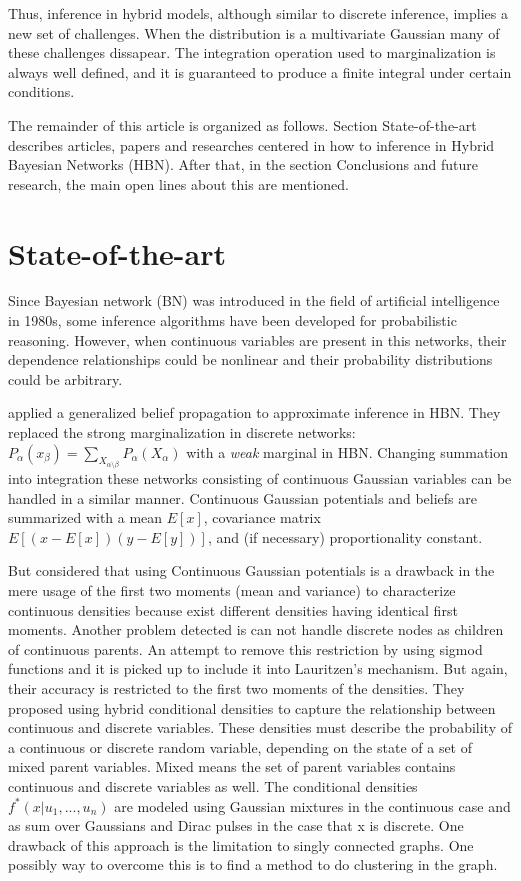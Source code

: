 \documentclass[a4paper,11pt]{article}
\begin{document}
Thus, inference in hybrid models, although similar to discrete inference, implies a new set of challenges. When the distribution is a multivariate Gaussian many of these challenges dissapear. The integration operation used to marginalization is always well defined, and it is guaranteed to produce a finite integral under certain conditions.

The remainder of this article is organized as follows. Section State-of-the-art describes articles, papers and  researches centered in how to inference in Hybrid Bayesian Networks (HBN). After that, in the section Conclusions and future research, the main open lines about this are mentioned.

\section{State-of-the-art}

Since Bayesian network (BN) was introduced in the field of artificial intelligence in 1980s, some inference algorithms have been developed for probabilistic reasoning. However, when continuous variables are present in this networks, their dependence relationships could be nonlinear and their probability distributions could be arbitrary. 

\cite{heskeszoeter2003} applied a generalized belief propagation to approximate inference in HBN. They replaced the strong marginalization in discrete networks: 
$ P_{\alpha}(x_{\beta}) = \sum_{X_{\alpha\setminus\beta}}P_{\alpha}(X_{\alpha}) $ with a \textit{weak} marginal in HBN. Changing summation into integration these networks consisting of continuous Gaussian variables can be handled in a similar manner. Continuous Gaussian potentials and beliefs are summarized with a mean $E[x]$, covariance matrix $ E[(x-E[x])(y-E[y])] $, and (if necessary) proportionality constant.

But \cite{heskeszoeter2004} considered that  using  Continuous Gaussian potentials is a drawback in the mere usage of the first two moments (mean and variance) to characterize continuous densities because exist different densities having identical first moments. Another problem detected is can not handle discrete nodes as children of continuous parents. An attempt to remove this restriction by using sigmod functions and it is picked up to include it into Lauritzen’s mechanism. But again, their accuracy is restricted to the first two moments of the densities.
 They proposed using hybrid conditional densities to capture the relationship between continuous and discrete variables. These densities must describe the probability of a continuous or discrete random variable, depending on the state of a set of mixed parent variables. Mixed means the set of parent variables contains continuous and discrete variables as well. The conditional densities $ f^{*}(x|u_1,...,u_n)$ are modeled using Gaussian mixtures in the continuous case and as sum over Gaussians and Dirac pulses in the case that x is discrete. One drawback of this approach is the limitation to singly connected graphs. One possibly way to overcome this is to find a method to do clustering in the graph.
\end{document}
